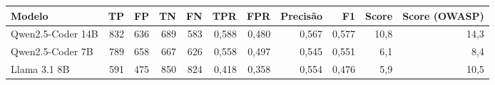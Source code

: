 \begin{tabular}{lrrrrrrrrrr}
\hline
Modelo & TP & FP & TN & FN & TPR & FPR & Precisão & F1 & Score & Score (OWASP) \\
\hline
Qwen2.5-Coder 14B & 832 & 636 & 689 & 583 & 0,588 & 0,480 & 0,567 & 0,577 & 10,8 & 14,3 \\
Qwen2.5-Coder 7B & 789 & 658 & 667 & 626 & 0,558 & 0,497 & 0,545 & 0,551 & 6,1 & 8,4 \\
Llama 3.1 8B & 591 & 475 & 850 & 824 & 0,418 & 0,358 & 0,554 & 0,476 & 5,9 & 10,5 \\
\hline
\end{tabular}
